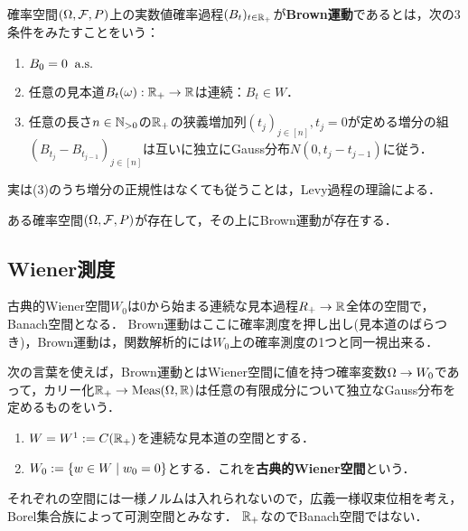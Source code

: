 \documentclass[uplatex,dvipdfmx]{jsreport}
\begin{document}
\begin{definition}
    確率空間$(\Omega,\mathcal{F},P)$上の実数値確率過程$(B_t)_{t\in\mathbb{R}_+}$が\textbf{Brown運動}であるとは，次の3条件をみたすことをいう：
    \begin{enumerate}
        \item $B_0=0\;\;\mathrm{a.s.}$
        \item 任意の見本道$B_t(\omega):\mathbb{R}_+\to\mathbb{R}$は連続：$B_t\in W$．
        \item 任意の長さ$n\in\mathbb{N}_{>0}$の$\mathbb{R}_+$の狭義増加列$(t_j)_{j\in[n]},t_j=0$が定める増分の組$(B_{t_j}-B_{t_{j-1}})_{j\in[n]}$は互いに独立にGauss分布$N(0,t_{j}-t_{j-1})$に従う．
    \end{enumerate}
\end{definition}
\begin{remarks}
    実は(3)のうち増分の正規性はなくても従うことは，Levy過程の理論による．
\end{remarks}

\begin{theorem}[Brown運動の存在]\label{thm-existence-of-Brownian-motion}
    ある確率空間$(\Omega,\mathcal{F},P)$が存在して，その上にBrown運動が存在する．
\end{theorem}

\subsection{Wiener測度}

\begin{tcolorbox}[colframe=ForestGreen, colback=ForestGreen!10!white,breakable,colbacktitle=ForestGreen!40!white,coltitle=black,fonttitle=\bfseries\sffamily,
title=]
    古典的Wiener空間$W_0$は$0$から始まる連続な見本過程$R_+\to\mathbb{R}$全体の空間で，Banach空間となる．
    Brown運動はここに確率測度を押し出し(見本道のばらつき)，Brown運動は，関数解析的には$W_0$上の確率測度の1つと同一視出来る．
\end{tcolorbox}

\begin{notation}
    次の言葉を使えば，Brown運動とはWiener空間に値を持つ確率変数$\Omega\to W_0$であって，カリー化$\mathbb{R}_+\to\mathrm{Meas}(\Omega,\mathbb{R})$は任意の有限成分について独立なGauss分布を定めるものをいう．
    \begin{enumerate}
        \item $W=W^1:=C(\mathbb{R}_+)$を連続な見本道の空間とする．
        \item $W_0:=\left\{w\in W\mid w_0=0\right\}$とする．これを\textbf{古典的Wiener空間}という．
    \end{enumerate}
    それぞれの空間には一様ノルムは入れられないので，広義一様収束位相を考え，Borel集合族によって可測空間とみなす．
    $\mathbb{R}_+$なのでBanach空間ではない．
\end{notation}
\end{document}
